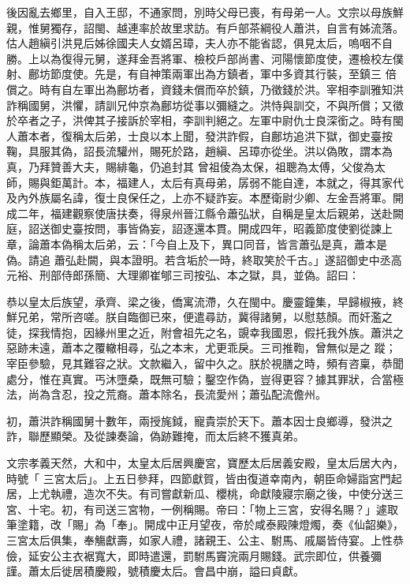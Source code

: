 \begin{pinyinscope}
 後因亂去鄉里，自入王邸，不通家問，別時父母已喪，有母弟一人。文宗以母族鮮親，惟舅獨存，詔閩、越連率於故里求訪。有戶部茶綱役人蕭洪，自言有姊流落。估人趙縝引洪見后姊徐國夫人女婿呂璋，夫人亦不能省認，俱見太后，嗚咽不自勝。上以為復得元舅，遂拜金吾將軍、檢校戶部尚書、河陽懷節度使，遷檢校左僕射、鄜坊節度使。先是，有自神策兩軍出為方鎮者，軍中多資其行裝，至鎮三
 倍償之。時有自左軍出為鄜坊者，資錢未償而卒於鎮，乃徵錢於洪。宰相李訓雅知洪詐稱國舅，洪懼，請訓兄仲京為鄜坊從事以彌縫之。洪恃與訓交，不與所償；又徵於卒者之子，洪俾其子接訴於宰相，李訓判絕之。左軍中尉仇士良深銜之。時有閩人蕭本者，復稱太后弟，士良以本上聞，發洪詐假，自鄜坊追洪下獄，御史臺按鞠，具服其偽，詔長流驩州，賜死於路，趙縝、呂璋亦從坐。洪以偽敗，謂本為真，乃拜贊善大夫，賜緋龜，仍追封其
 曾祖倰為太保，祖聰為太傅，父俊為太師，賜與鉅萬計。本，福建人，太后有真母弟，孱弱不能自達，本就之，得其家代及內外族屬名諱，復士良保任之，上亦不疑詐妄。本歷衛尉少卿、左金吾將軍。開成二年，福建觀察使唐扶奏，得泉州晉江縣令蕭弘狀，自稱是皇太后親弟，送赴闕庭，詔送御史臺按問，事皆偽妄，詔逐還本貫。開成四年，昭義節度使劉從諫上章，論蕭本偽稱太后弟，云：「今自上及下，異口同音，皆言蕭弘是真，蕭本是偽。請追
 蕭弘赴闕，與本證明。若含垢於一時，終取笑於千古。」遂詔御史中丞高元裕、刑部侍郎孫簡、大理卿崔郇三司按弘、本之獄，具，並偽。詔曰：



 恭以皇太后族望，承齊、梁之後，僑寓流滯，久在閩中。慶靈鐘集，早歸椒掖，終鮮兄弟，常所咨嗟。朕自臨御已來，便遣尋訪，冀得諸舅，以慰慈顏。而奸濫之徒，探我情抱，因緣州里之近，附會祖先之名，覬幸我國恩，假托我外族。蕭洪之惡跡未遠，蕭本之覆轍相尋，弘之本末，尤更乖戾。三司推鞫，曾無似是之
 蹤；宰臣參驗，見其難容之狀。文款繼入，留中久之。朕於視膳之時，頻有咨稟，恭聞處分，惟在真實。丐沐墮桑，既無可驗；鑿空作偽，豈得更容？據其罪狀，合當極法，尚為含忍，投之荒裔。蕭本除名，長流愛州；蕭弘配流儋州。



 初，蕭洪詐稱國舅十數年，兩授旄鉞，寵貴崇於天下。蕭本因士良鄉導，發洪之詐，聯歷顯榮。及從諫奏論，偽跡難掩，而太后終不獲真弟。



 文宗孝義天然，大和中，太皇太后居興慶宮，寶歷太后居義安殿，皇太后居大內，時號「
 三宮太后」。上五日參拜，四節獻賀，皆由復道幸南內，朝臣命婦詣宮門起居，上尤執禮，造次不失。有司嘗獻新瓜、櫻桃，命獻陵寢宗廟之後，中使分送三宮、十宅。初，有司送三宮物，一例稱賜。帝曰：「物上三宮，安得名賜？」遽取筆塗籍，改「賜」為「奉」。開成中正月望夜，帝於咸泰殿陳燈燭，奏《仙韶樂》，三宮太后俱集，奉觴獻壽，如家人禮，諸親王、公主、駙馬、戚屬皆侍宴。上性恭儉，延安公主衣裾寬大，即時遣還，罰駙馬竇浣兩月賜錢。武宗即位，供養彌
 謹。蕭太后徙居積慶殿，號積慶太后。會昌中崩，謚曰貞獻。




\end{pinyinscope}
